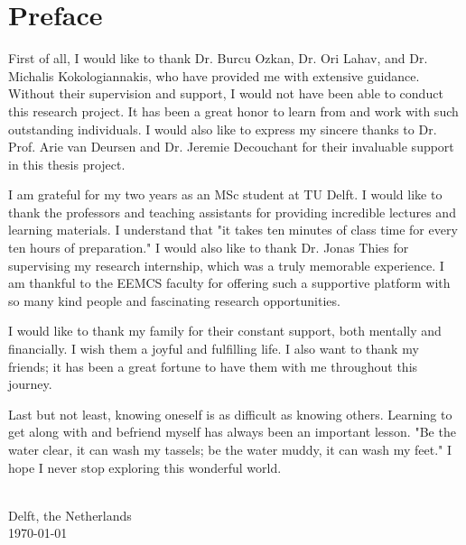 \chapter{\label{cha:Preface}Preface}

First of all, I would like to thank Dr. Burcu Ozkan, Dr. Ori Lahav, and Dr. Michalis Kokologiannakis, who have provided me with extensive guidance. Without their supervision and support, I would not have been able to conduct this research project. It has been a great honor to learn from and work with such outstanding individuals. I would also like to express my sincere thanks to Dr. Prof. Arie van Deursen and Dr. Jeremie Decouchant for their invaluable support in this thesis project.

I am grateful for my two years as an MSc student at TU Delft. I would like to thank the professors and teaching assistants for providing incredible lectures and learning materials. I understand that "it takes ten minutes of class time for every ten hours of preparation." I would also like to thank Dr. Jonas Thies for supervising my research internship, which was a truly memorable experience. I am thankful to the EEMCS faculty for offering such a supportive platform with so many kind people and fascinating research opportunities.

I would like to thank my family for their constant support, both mentally and financially. I wish them a joyful and fulfilling life. I also want to thank my friends; it has been a great fortune to have them with me throughout this journey.

Last but not least, knowing oneself is as difficult as knowing others. Learning to get along with and befriend myself has always been an important lesson. "Be the water clear, it can wash my tassels; be the water muddy, it can wash my feet." I hope I never stop exploring this wonderful world.





\vskip1cm
\begin{flushright}
	\theauthor\\
	Delft, the Netherlands \\
	\today\\
\end{flushright}

